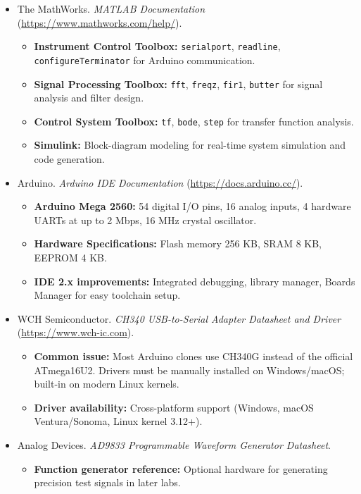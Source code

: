 \documentclass[12pt]{article}
\begin{document}
\begin{itemize}
    \item The MathWorks. \textit{MATLAB Documentation} (\url{https://www.mathworks.com/help/}).
    \begin{itemize}
        \item \textbf{Instrument Control Toolbox:} \texttt{serialport}, \texttt{readline}, \texttt{configureTerminator} for Arduino communication.
        \item \textbf{Signal Processing Toolbox:} \texttt{fft}, \texttt{freqz}, \texttt{fir1}, \texttt{butter} for signal analysis and filter design.
        \item \textbf{Control System Toolbox:} \texttt{tf}, \texttt{bode}, \texttt{step} for transfer function analysis.
        \item \textbf{Simulink:} Block-diagram modeling for real-time system simulation and code generation.
    \end{itemize}

    \item Arduino. \textit{Arduino IDE Documentation} (\url{https://docs.arduino.cc/}).
    \begin{itemize}
        \item \textbf{Arduino Mega 2560:} 54 digital I/O pins, 16 analog inputs, 4 hardware UARTs at up to 2 Mbps, 16 MHz crystal oscillator.
        \item \textbf{Hardware Specifications:} Flash memory 256 KB, SRAM 8 KB, EEPROM 4 KB.
        \item \textbf{IDE 2.x improvements:} Integrated debugging, library manager, Boards Manager for easy toolchain setup.
    \end{itemize}

    \item WCH Semiconductor. \textit{CH340 USB-to-Serial Adapter Datasheet and Driver} (\url{https://www.wch-ic.com}).
    \begin{itemize}
        \item \textbf{Common issue:} Most Arduino clones use CH340G instead of the official ATmega16U2. Drivers must be manually installed on Windows/macOS; built-in on modern Linux kernels.
        \item \textbf{Driver availability:} Cross-platform support (Windows, macOS Ventura/Sonoma, Linux kernel 3.12+).
    \end{itemize}

    \item Analog Devices. \textit{AD9833 Programmable Waveform Generator Datasheet}.
    \begin{itemize}
        \item \textbf{Function generator reference:} Optional hardware for generating precision test signals in later labs.
    \end{itemize}
\end{itemize}
\end{document}
